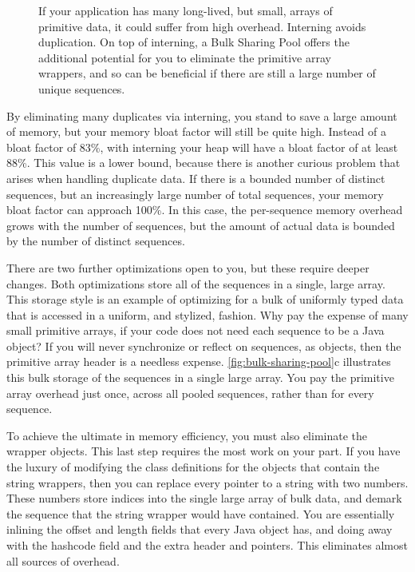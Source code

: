 \begin{figure}
	\caption{If your application has many long-lived, but small, arrays of
	primitive data, it could suffer from high overhead. Interning avoids
	duplication. On top of interning, a Bulk Sharing Pool offers the additional
	potential for you to eliminate the primitive array wrappers, and so can be
	beneficial if there are still a large number of unique sequences.}
	\label{fig:bulk-sharing-pool}
\end{figure}

By eliminating many duplicates via interning, you stand to save a large amount of
memory, but your memory bloat factor will still be quite high. Instead of a bloat
factor of 83\%, with interning your heap will have a bloat factor of at least
88\%.
This value is a lower bound, because there is another curious problem that arises
when handling duplicate data. If there is a bounded number of distinct sequences,
but an increasingly large number of total sequences, your memory bloat factor can
approach 100\%. In this case, the per-sequence memory overhead grows with the
number of sequences, but the amount of actual data is bounded by the number of
distinct sequences.

There are two further optimizations open to you, but these require deeper
changes. Both optimizations store all of the sequences in a single, large array.
This storage style is an example of optimizing for a bulk of uniformly typed data
that is accessed in a uniform, and stylized, fashion. Why pay the expense of many
small primitive arrays, if your code does not need each sequence to be a Java
object? If you will never synchronize or reflect on sequences, as objects, then
the primitive array header is a needless expense.
\autoref{fig:bulk-sharing-pool}c illustrates this bulk storage of the sequences
in a single large array. You pay the primitive array overhead just once, across
all pooled sequences, rather than for every sequence. 

To achieve the ultimate in memory efficiency, you must also eliminate the
 wrapper objects. This last step requires the most work on your
part. If you have the luxury of modifying the class definitions for the objects
that contain the string wrappers, then you can replace every pointer to a string
with two numbers. These numbers store indices into the single large
array of bulk data, and demark the sequence that the string wrapper would have
contained. You are essentially inlining the offset and length fields that every
Java  object has, and doing away with the hashcode field and the
extra header and pointers. This eliminates almost all sources of overhead.


